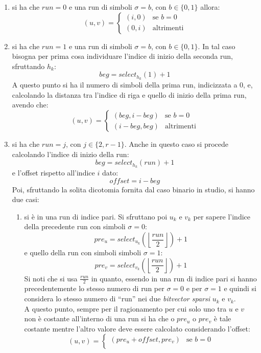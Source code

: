 \begin{enumerate}
  \item si ha che $run=0$ e una run di simboli $\sigma=b$, con $b\in\{0,1\}$
  allora:
  \[(u,v)=
    \begin{cases}
      (i,0)&\mbox{se } b=0\\
      (0,i)&\mbox{altrimenti}
    \end{cases}
  \]
  \item si ha che $run=1$ e una run di simboli $\sigma=b$, con $b\in\{0,1\}$. In
  tal caso bisogna per prima cosa individuare l'indice di inizio della seconda
  run, sfruttando $h_k$:
  \[beg = select_{h_k}(1)+1\]
  A questo punto si ha il numero di simboli della prima run, indicizzata a 0, e,
  calcolando la distanza tra l'indice di riga e quello di inizio della prima
  run, avendo che:
  \[(u,v)=
    \begin{cases}
      (beg,i-beg)&\mbox{se } b=0\\
      (i-beg,beg)&\mbox{altrimenti}
    \end{cases}
  \]
  \item si ha che $run=j$, con $j\in\{2,r-1\}$. Anche in questo caso  si procede
  calcolando l'indice di inizio della run:
  \[beg = select_{h_k}(run)+1\]
  e l'offset rispetto all'indice $i$ dato:
  \[offset = i-beg\]
  Poi, sfruttando la solita dicotomia fornita dal caso binario in studio, si
  hanno due casi: 
  \begin{enumerate}
    \item si è in una run di indice pari.
    Si sfruttano poi $u_k$ e $v_k$ per sapere l'indice della precedente run con
    simboli $\sigma=0$:
    \[pre_u=select_{u_k}\left(\left\lfloor\frac{run}{2}\right\rfloor\right)+1\]
    e quello della run con simboli simboli $\sigma=1$:
    \[pre_v=select_{v_k}\left(\left\lfloor\frac{run}{2}\right\rfloor\right)+1\]
    Si noti che si usa $\frac{run}{2}$ in quanto, essendo in una run di indice
    pari si hanno precedentemente lo stesso numero di run per $\sigma=0$ e per
    $\sigma=1$ e quindi si considera lo stesso numero di ``run'' nei due
    \textit{bitvector sparsi} $u_k$ e $v_k$.\\
    A questo punto, sempre per il ragionamento per cui solo uno tra $u$ e $v$
    non è costante all'interno di una run si ha che o $pre_u$ o $pre_v$ è tale
    costante mentre l'altro valore deve essere calcolato considerando l'offset:
    \[(u,v)=
      \begin{cases}
        (pre_u+offset,pre_v)&\mbox{se } b=0\\

\end{cases}\]
\end{enumerate}
\end{enumerate}

